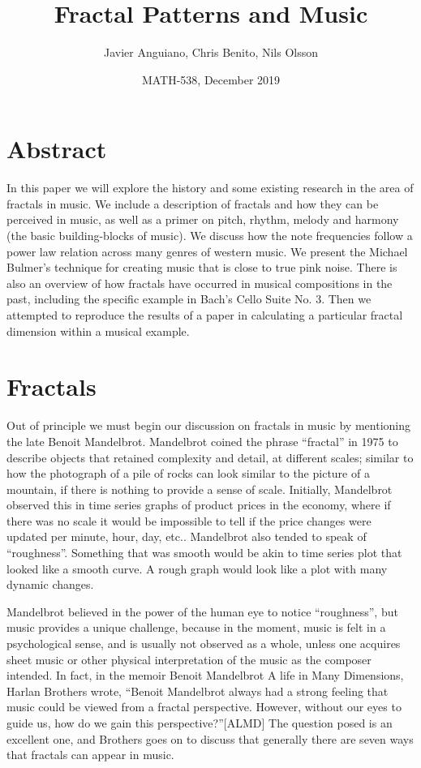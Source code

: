 \documentclass{article}
\title{Fractal Patterns and Music}
\date{MATH-538, December 2019}
\author{Javier Anguiano, Chris Benito, Nils Olsson}
\begin{document}
\maketitle

\section{Abstract}

In this paper we will explore the history and some existing research in the area
of fractals in music. We include a description of fractals and how they can be
perceived in music, as well as a primer on pitch, rhythm, melody and harmony
(the basic building-blocks of music). We discuss how the note frequencies follow
a power law relation across many genres of western music. We present the Michael
Bulmer’s technique for creating music that is close to true pink noise. There is
also an overview of how fractals have occurred in musical compositions in the
past, including the specific example in Bach’s Cello Suite No. 3. Then we
attempted to reproduce the results of a paper in calculating a particular
fractal dimension within a musical example.

\begin{center}
    \hrulefill{}
\end{center}

\section{Fractals}

Out of principle we must begin our discussion on fractals in music by mentioning
the late Benoit Mandelbrot. Mandelbrot coined the phrase “fractal” in 1975 to
describe objects that retained complexity and detail, at different scales;
similar to how the photograph of a pile of rocks can look similar to the picture
of a mountain, if there is nothing to provide a sense of scale\cite{3}. Initially,
Mandelbrot observed this in time series graphs of product prices in the economy,
where if there was no scale it would be impossible to tell if the price changes
were updated per minute, hour, day, etc.\cite{3}. Mandelbrot also tended to speak of
“roughness”\cite{4}. Something that was smooth would be akin to time series plot that
looked like a smooth curve. A rough graph would look like a plot with many
dynamic changes.

Mandelbrot believed in the power of the human eye to notice
“roughness”\cite{3,4}, but music provides a unique challenge, because in the
moment, music is felt in a psychological sense, and is usually not observed as a
whole, unless one acquires sheet music or other physical interpretation of the
music as the composer intended. In fact, in the memoir Benoit Mandelbrot A life
in Many Dimensions, Harlan Brothers wrote, “Benoit Mandelbrot always had a
strong feeling that music could be viewed from a fractal perspective. However,
without our eyes to guide us, how do we gain this perspective?”[ALMD] The
question posed is an excellent one, and Brothers goes on to discuss that
generally there are seven ways that fractals can appear in music.
\end{document}
